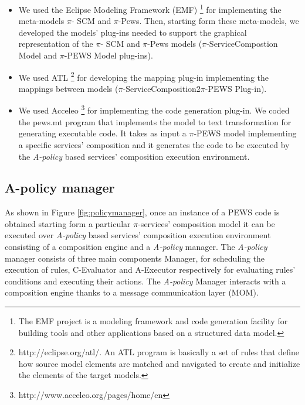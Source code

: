 \begin{itemize}
\item 	We  used the Eclipse Modeling Framework (EMF) \footnote {The EMF project is a modeling framework and code generation facility for building tools and other applications based on a structured data model.}   for implementing the meta-models  $\pi$- SCM and $\pi$-{\sc Pews}. Then, starting form these meta-models, we  developed the models' plug-ins needed to support the graphical representation of the $\pi$- SCM and $\pi$-{\sc Pews} models ($\pi$-ServiceCompostion Model and $\pi$-PEWS Model plug-ins).

\item	 We used  ATL \footnote{http://eclipse.org/atl/. An ATL program is basically a set of rules that define how source model elements are matched and navigated to create and initialize the elements of the target models.}
for  developing the mapping plug-in implementing the  mappings between models ($\pi$-ServiceComposition2$\pi$-PEWS Plug-in).

\item 	We  used Acceleo \footnote{http://www.acceleo.org/pages/home/en} for implementing  the code generation plug-in. We coded the pews.mt program  that implements the model to text transformation for generating executable code. It takes as input a $\pi$-PEWS model implementing a specific services' composition and it generates the code to be executed by the 
{\em A-policy} based services' composition execution environment. 

\end{itemize}


\subsection{A-policy manager}

As  shown in Figure \ref{fig:policymanager}, once an instance of a PEWS code is obtained starting form a particular $\pi$-services' composition model it can be executed over {\em A-policy} based services' composition execution environment  consisting of a composition engine and a {\em A-policy} manager.  The  {\em A-policy} manager  consists of three main components Manager, for scheduling the execution of rules, C-Evaluator and A-Executor respectively for evaluating rules' conditions and executing their actions. The {\em A-policy} Manager interacts with a composition engine thanks to a  message communication layer (MOM).


